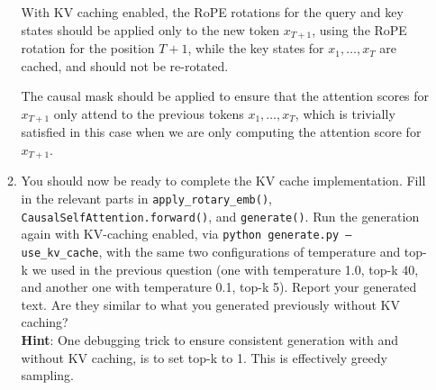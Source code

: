 \begin{enumerate}
\begin{enumerate}
    \begin{answerbox}[1.5in]

        With KV caching enabled, the RoPE rotations for the query and key states
        should be applied only to the new token $x_{T+1}$, using the RoPE
        rotation for the position $T+1$, while the key states for $x_1, \dots,
        x_T$ are cached, and should not be re-rotated. 

        The causal mask should be applied to ensure that the attention scores
        for $x_{T+1}$ only attend to the previous tokens $x_1, \dots, x_T$,
        which is trivially satisfied in this case when we are only computing the
        attention score for $x_{T+1}$.

    \end{answerbox}
    
    \item You should now be ready to complete the KV cache implementation. Fill
    in the relevant parts in \texttt{apply\_rotary\_emb()},
    \texttt{CausalSelfAttention.forward()}, and \texttt{generate()}. Run the
    generation again with KV-caching enabled, via \texttt{python generate.py
    --use\_kv\_cache}, with the same two configurations of temperature and top-k
    we used in the previous question (one with temperature 1.0, top-k 40, and
    another one with temperature 0.1, top-k 5). Report your generated text. Are
    they similar to what you generated previously without KV caching? \\
    \textbf{Hint}: One debugging trick to ensure consistent generation with and
    without KV caching, is to set top-k to 1. This is effectively greedy
    sampling.

    \begin{answerbox}[4in]


\end{answerbox}
\end{enumerate}
\end{enumerate}
